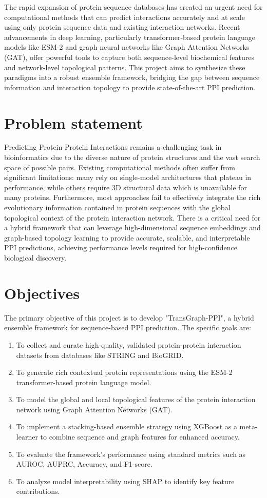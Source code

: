 \documentclass[12pt,a4paper]{report}
\begin{document}
The rapid expansion of protein sequence databases has created an urgent need for computational methods that can predict interactions accurately and at scale using only protein sequence data and existing interaction networks. Recent advancements in deep learning, particularly transformer-based protein language models like ESM-2 and graph neural networks like Graph Attention Networks (GAT), offer powerful tools to capture both sequence-level biochemical features and network-level topological patterns. This project aims to synthesize these paradigms into a robust ensemble framework, bridging the gap between sequence information and interaction topology to provide state-of-the-art PPI prediction.

\section{Problem statement}
Predicting Protein-Protein Interactions remains a challenging task in bioinformatics due to the diverse nature of protein structures and the vast search space of possible pairs. Existing computational methods often suffer from significant limitations: many rely on single-model architectures that plateau in performance, while others require 3D structural data which is unavailable for many proteins. Furthermore, most approaches fail to effectively integrate the rich evolutionary information contained in protein sequences with the global topological context of the protein interaction network. There is a critical need for a hybrid framework that can leverage high-dimensional sequence embeddings and graph-based topology learning to provide accurate, scalable, and interpretable PPI predictions, achieving performance levels required for high-confidence biological discovery.

\section{Objectives}
The primary objective of this project is to develop "TransGraph-PPI", a hybrid ensemble framework for sequence-based PPI prediction. The specific goals are:
\begin{enumerate}
    \item To collect and curate high-quality, validated protein-protein interaction datasets from databases like STRING and BioGRID.
    \item To generate rich contextual protein representations using the ESM-2 transformer-based protein language model.
    \item To model the global and local topological features of the protein interaction network using Graph Attention Networks (GAT).
    \item To implement a stacking-based ensemble strategy using XGBoost as a meta-learner to combine sequence and graph features for enhanced accuracy.
    \item To evaluate the framework's performance using standard metrics such as AUROC, AUPRC, Accuracy, and F1-score.
    \item To analyze model interpretability using SHAP to identify key feature contributions.
\end{enumerate}
\end{document}
